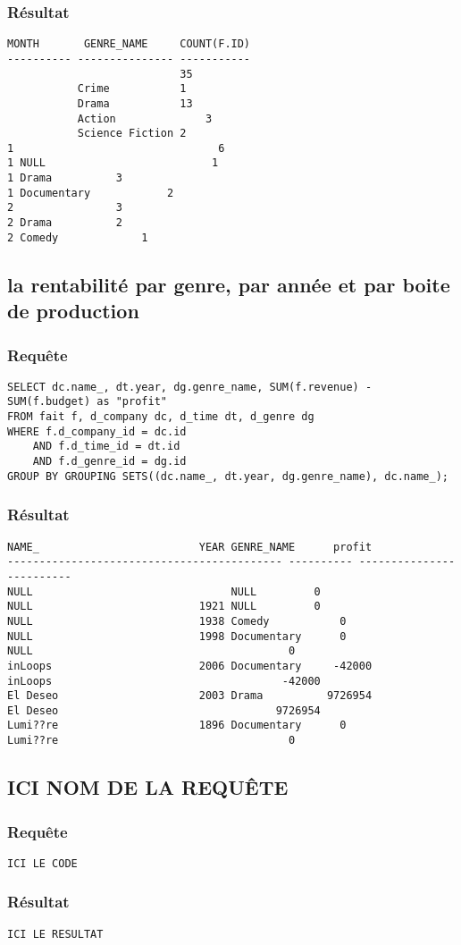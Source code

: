 \subsubsection{Résultat}
\begin{lstlisting}
MONTH       GENRE_NAME	   COUNT(F.ID)
---------- --------------- -----------
			               35
		   Crime		   1
		   Drama		   13
		   Action		       3
		   Science Fiction 2
1			                     6
1 NULL 		      				1
1 Drama		     3
1 Documentary		     2
2			     3
2 Drama		     2
2 Comedy		     1

\end{lstlisting}

\subsection{la rentabilité par genre, par année et par boite de production}
\subsubsection{Requête}
\begin{lstlisting}
SELECT dc.name_, dt.year, dg.genre_name, SUM(f.revenue) - SUM(f.budget) as "profit"
FROM fait f, d_company dc, d_time dt, d_genre dg
WHERE f.d_company_id = dc.id
	AND f.d_time_id = dt.id
	AND f.d_genre_id = dg.id
GROUP BY GROUPING SETS((dc.name_, dt.year, dg.genre_name), dc.name_);

\end{lstlisting}
\subsubsection{Résultat}
\begin{lstlisting}
NAME_						  YEAR GENRE_NAME	   profit
------------------------------------------- ---------- --------------- ----------
NULL						       NULL			0
NULL						  1921 NULL			0
NULL						  1938 Comedy			0
NULL						  1998 Documentary		0
NULL										0
inLoops 					  2006 Documentary	   -42000
inLoops 								   -42000
El Deseo					  2003 Drama		  9726954
El Deseo								  9726954
Lumi??re					  1896 Documentary		0
Lumi??re									0

\end{lstlisting}

\subsection{ICI NOM DE LA REQUÊTE}
\subsubsection{Requête}
\begin{lstlisting}
ICI LE CODE
\end{lstlisting}
\subsubsection{Résultat}
\begin{lstlisting}
ICI LE RESULTAT
\end{lstlisting}
